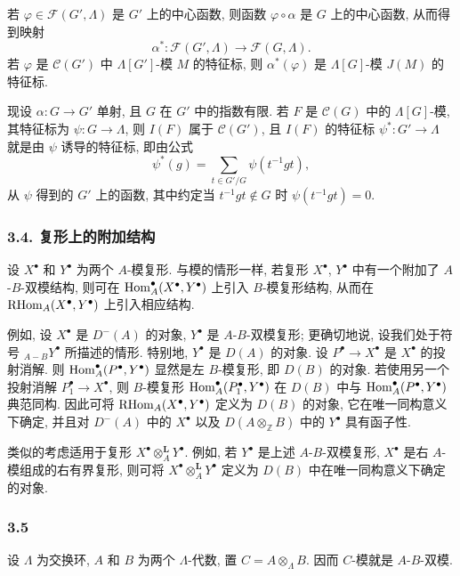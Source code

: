 若 $\varphi\in\mathcal F(G',\Lambda)$ 是 $G'$ 上的中心函数, 则函数 $\varphi\circ\alpha$ 是 $G$ 上的中心函数, 从而得到映射
\[
\alpha^*: \mathcal F(G',\Lambda)\longrightarrow\mathcal F(G,\Lambda).
\]
若 $\varphi$ 是 $\mathcal C(G')$ 中 $\Lambda[G']$-模 $M$ 的特征标, 则 $\alpha^*(\varphi)$ 是 $\Lambda[G]$-模 $J(M)$ 的特征标.

现设 $\alpha:G\to G'$ 单射, 且 $G$ 在 $G'$ 中的指数有限. 若 $F$ 是 $\mathcal C(G)$ 中的 $\Lambda[G]$-模, 其特征标为 $\psi:G\to\Lambda$, 则 $I(F)$ 属于 $\mathcal C(G')$, 且 $I(F)$ 的特征标 $\psi^*:G'\to\Lambda$ 就是由 $\psi$ 诱导的特征标, 即由公式
\[
\psi^*(g)=\sum_{t\in G'/G}\psi(t^{-1}gt),
\tag{3.3.1}
\]
从 $\psi$ 得到的 $G'$ 上的函数, 其中约定当 $t^{-1}gt\notin G$ 时 $\psi(t^{-1}gt)=0$.

\subsubsection*{3.4. 复形上的附加结构}

设 $X^\bullet$ 和 $Y^\bullet$ 为两个 $A$-模复形. 与模的情形一样, 若复形 $X^\bullet$, $Y^\bullet$ 中有一个附加了 $A$-$B$-双模结构, 则可在 $\operatorname{Hom}_A^\bullet(X^\bullet,Y^\bullet)$ 上引入 $B$-模复形结构, 从而在 $\mathrm{RHom}_A(X^\bullet,Y^\bullet)$ 上引入相应结构.

例如, 设 $X^\bullet$ 是 $D^-(A)$ 的对象, $Y^\bullet$ 是 $A$-$B$-双模复形; 更确切地说, 设我们处于符号 ${}_{A-B}Y^\bullet$ 所描述的情形. 特别地, $Y^\bullet$ 是 $D(A)$ 的对象. 设 $P^\bullet\to X^\bullet$ 是 $X^\bullet$ 的投射消解. 则 $\operatorname{Hom}_A^\bullet(P^\bullet,Y^\bullet)$ 显然是左 $B$-模复形, 即 $D(B)$ 的对象. 若使用另一个投射消解 $P_1^\bullet\to X^\bullet$, 则 $B$-模复形 $\operatorname{Hom}_A^\bullet(P_1^\bullet,Y^\bullet)$ 在 $D(B)$ 中与 $\operatorname{Hom}_A^\bullet(P^\bullet,Y^\bullet)$ 典范同构. 因此可将 $\mathrm{RHom}_A(X^\bullet,Y^\bullet)$ 定义为 $D(B)$ 的对象, 它在唯一同构意义下确定, 并且对 $D^-(A)$ 中的 $X^\bullet$ 以及 $D(A\otimes_{\mathbb Z}B)$ 中的 $Y^\bullet$ 具有函子性.

类似的考虑适用于复形 $X^\bullet\otimes_A^{\mathbf L}Y^\bullet$. 例如, 若 $Y^\bullet$ 是上述 $A$-$B$-双模复形, $X^\bullet$ 是右 $A$-模组成的右有界复形, 则可将 $X^\bullet\otimes_A^{\mathbf L}Y^\bullet$ 定义为 $D(B)$ 中在唯一同构意义下确定的对象.

\subsubsection*{3.5}

设 $\Lambda$ 为交换环, $A$ 和 $B$ 为两个 $\Lambda$-代数, 置 $C=A\otimes_\Lambda B$. 因而 $C$-模就是 $A$-$B$-双模.

